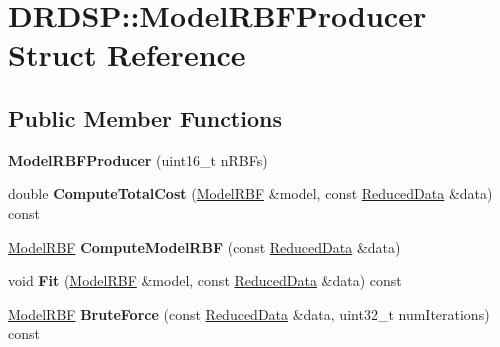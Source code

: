 \hypertarget{struct_d_r_d_s_p_1_1_model_r_b_f_producer}{\section{D\-R\-D\-S\-P\-:\-:Model\-R\-B\-F\-Producer Struct Reference}
\label{struct_d_r_d_s_p_1_1_model_r_b_f_producer}
}
\subsection*{Public Member Functions}
\begin{DoxyCompactItemize}
\item 
\hypertarget{struct_d_r_d_s_p_1_1_model_r_b_f_producer_a4feeee95b1c3cfea18868ad3a2e7d379}{{\bfseries Model\-R\-B\-F\-Producer} (uint16\-\_\-t n\-R\-B\-Fs)}\label{struct_d_r_d_s_p_1_1_model_r_b_f_producer_a4feeee95b1c3cfea18868ad3a2e7d379}

\item 
\hypertarget{struct_d_r_d_s_p_1_1_model_r_b_f_producer_a7d367cacba6270ef6a72432e07db8efb}{double {\bfseries Compute\-Total\-Cost} (\hyperlink{struct_d_r_d_s_p_1_1_model_r_b_f}{Model\-R\-B\-F} \&model, const \hyperlink{struct_d_r_d_s_p_1_1_reduced_data}{Reduced\-Data} \&data) const }\label{struct_d_r_d_s_p_1_1_model_r_b_f_producer_a7d367cacba6270ef6a72432e07db8efb}

\item 
\hypertarget{struct_d_r_d_s_p_1_1_model_r_b_f_producer_a400a0fee1030b359e2d4df51cebb520f}{\hyperlink{struct_d_r_d_s_p_1_1_model_r_b_f}{Model\-R\-B\-F} {\bfseries Compute\-Model\-R\-B\-F} (const \hyperlink{struct_d_r_d_s_p_1_1_reduced_data}{Reduced\-Data} \&data)}\label{struct_d_r_d_s_p_1_1_model_r_b_f_producer_a400a0fee1030b359e2d4df51cebb520f}

\item 
\hypertarget{struct_d_r_d_s_p_1_1_model_r_b_f_producer_a650ade3b485d5e9b5d2dc2a22da126fd}{void {\bfseries Fit} (\hyperlink{struct_d_r_d_s_p_1_1_model_r_b_f}{Model\-R\-B\-F} \&model, const \hyperlink{struct_d_r_d_s_p_1_1_reduced_data}{Reduced\-Data} \&data) const }\label{struct_d_r_d_s_p_1_1_model_r_b_f_producer_a650ade3b485d5e9b5d2dc2a22da126fd}

\item 
\hypertarget{struct_d_r_d_s_p_1_1_model_r_b_f_producer_af0de40c33f79ce580cc52bc510987a0e}{\hyperlink{struct_d_r_d_s_p_1_1_model_r_b_f}{Model\-R\-B\-F} {\bfseries Brute\-Force} (const \hyperlink{struct_d_r_d_s_p_1_1_reduced_data}{Reduced\-Data} \&data, uint32\-\_\-t num\-Iterations) const }\label{struct_d_r_d_s_p_1_1_model_r_b_f_producer_af0de40c33f79ce580cc52bc510987a0e}

\end{DoxyCompactItemize}
